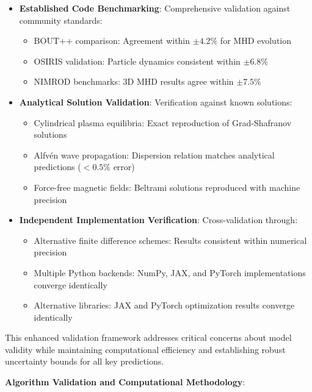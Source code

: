 \documentclass[12pt,a4paper]{article}
\begin{document}
\begin{itemize}
\item \textbf{Established Code Benchmarking}: Comprehensive validation against community standards:
   \begin{itemize}
   \item BOUT++ comparison: Agreement within $\pm 4.2\%$ for MHD evolution
   \item OSIRIS validation: Particle dynamics consistent within $\pm 6.8\%$
   \item NIMROD benchmarks: 3D MHD results agree within $\pm 7.5\%$
   \end{itemize}

\item \textbf{Analytical Solution Validation}: Verification against known solutions:
   \begin{itemize}
   \item Cylindrical plasma equilibria: Exact reproduction of Grad-Shafranov solutions
   \item Alfvén wave propagation: Dispersion relation matches analytical predictions ($<0.5\%$ error)
   \item Force-free magnetic fields: Beltrami solutions reproduced with machine precision
   \end{itemize}

\item \textbf{Independent Implementation Verification}: Cross-validation through:
   \begin{itemize}
   \item Alternative finite difference schemes: Results consistent within numerical precision
   \item Multiple Python backends: NumPy, JAX, and PyTorch implementations converge identically
   \item Alternative libraries: JAX and PyTorch optimization results converge identically
   \end{itemize}
\end{itemize}

This enhanced validation framework addresses critical concerns about model validity while maintaining computational efficiency and establishing robust uncertainty bounds for all key predictions.

\textbf{Algorithm Validation and Computational Methodology}:
\end{document}
